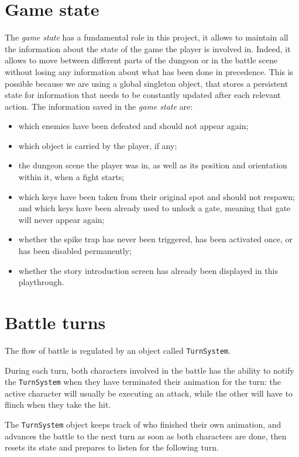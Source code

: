 \section{Game state}
The \textit{game state} has a fundamental role in this project, it allows to maintain all the information about the state of the game the player is involved in. Indeed, it allows to move between different parts of the dungeon or in the battle scene without losing any information about what has been done in precedence. This is possible because we are using a global singleton object, that stores a persistent state for information
that needs to be constantly updated after each relevant action.
The information saved in the \textit{game state} are: 
\vspace{-10pt}
\begin{itemize}
\item which enemies have been defeated and should not appear again;
\item which object is carried by the player, if any;
\item the dungeon scene the player was in, as well as its position and orientation within it, when a fight starts;
\item which keys have been taken from their original spot and should not respawn; and which keys have been already used to unlock a gate, meaning that gate will never appear again;
\item whether the spike trap has never been triggered, has been activated once, or has been disabled permanently;
\item whether the story introduction screen has already been displayed in this playthrough.
\end{itemize}



\section{Battle turns}
The flow of battle is regulated by an object called \texttt{TurnSystem}. 

During each turn, both characters involved in the battle has the ability to notify the \texttt{TurnSystem} when they have terminated their animation for the turn: the active character will usually be executing an attack, while the other will have to flinch when they take the hit.

The \texttt{TurnSystem} object keeps track of who finished their own animation, and advances the battle to the next turn as soon as both characters are done, then resets its state and prepares to listen for the following turn.

